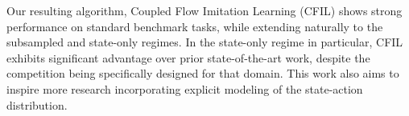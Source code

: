 Our resulting algorithm, Coupled Flow Imitation Learning (CFIL) shows strong performance on standard benchmark tasks, while extending naturally to the subsampled and state-only regimes. In the state-only regime in particular, CFIL exhibits significant advantage over prior state-of-the-art work, despite the competition being specifically designed for that domain. This work also aims to inspire more research incorporating explicit modeling of the state-action distribution.


